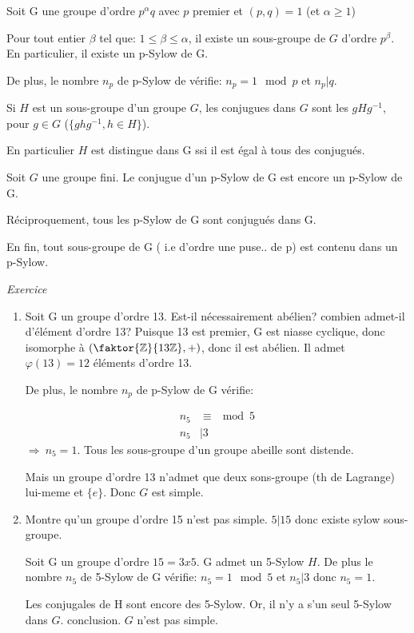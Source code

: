 \begin{theorem} Soit G une groupe d'ordre $p^\alpha q$ avec $p$ premier et $(p, q)= 1$ (et $\alpha \geq 1$)

Pour tout entier $\beta$ tel que: $1\leq \beta \leq \alpha$, il existe un sous-groupe de $G$ d'ordre $p^\beta$. En particulier, il existe un p-Sylow de G.

De plus, le nombre $n_p$ de p-Sylow de vérifie:
$n_p = 1 \mod p$ et $n_p | q$.

\end{theorem}

\begin{definition}
	Si $H$ est un sous-groupe d'un groupe $G$, les conjugues dans $G$ sont les $gHg^{-1}$, pour $g\in G$ ($\{ghg^{-1}, h\in H\}$).
\end{definition}

En particulier $H$ est distingue dans G ssi il est égal à tous des conjugués.

\begin{theorem}
Soit $G$ une groupe fini.
Le conjugue d'un p-Sylow de G est encore un p-Sylow de G.

Réciproquement, tous les p-Sylow de G sont conjugués dans G.

En fin, tout sous-groupe de G ( i.e d'ordre une puse.. de p) est contenu dans un p-Sylow.
\end{theorem}

\emph{Exercice}
\begin{enumerate}
	\item Soit G un groupe d'ordre 13. Est-il nécessairement abélien? combien admet-il d'élément d'ordre 13?
	Puisque 13 est premier, G est niasse cyclique, donc isomorphe à $(\faktor{\mathbb{Z}}{13\mathbb{Z}},+)$, donc il est abélien. Il admet $\varphi(13)=12$ éléments d'ordre 13.
	
	De plus, le nombre $n_p$ de p-Sylow de G vérifie:
	
	\begin{align*}
		n_5  &\equiv  \mod 5\\ n_5 &| 3
	\end{align*}
	$\Rightarrow\ n_5 = 1$.
	Tous les sous-groupe d'un groupe abeille sont distende.
	
	Mais un groupe d'ordre 13 n'admet que deux sons-groupe (th de Lagrange) lui-meme et $\{e\}$. Donc $G$ est simple.
	\item Montre qu'un groupe d'ordre 15 n'est pas simple. $5|15$ donc existe sylow sous-groupe. 
	
	Soit G un groupe d'ordre $15=3x5$. G admet un 5-Sylow $H$. De plus le nombre $n_5$ de 5-Sylow de G vérifie: $n_5=1 \mod 5$ et $n_5 | 3$ donc $n_5=1$.
	
	Les conjugales de H sont encore des 5-Sylow. Or, il n'y a s'un seul 5-Sylow dans $G$. conclusion. $G$ n'est pas simple.
\end{enumerate}


